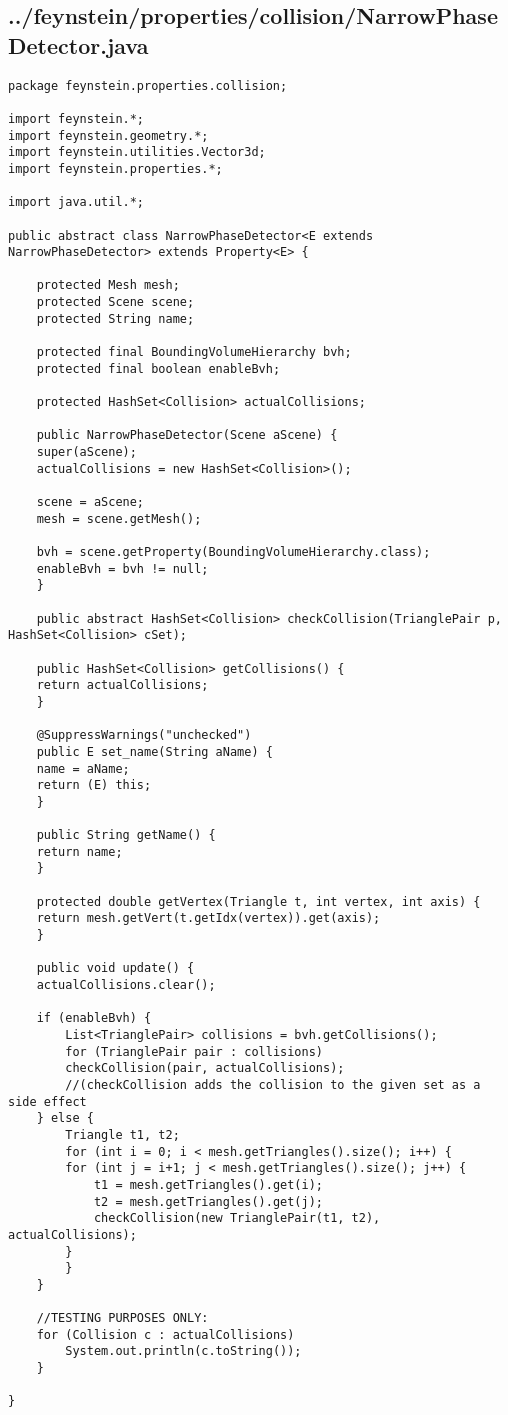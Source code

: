 \subsection*{../feynstein/properties/collision/NarrowPhaseDetector.java}
\begin{lstlisting}
package feynstein.properties.collision;

import feynstein.*;
import feynstein.geometry.*;
import feynstein.utilities.Vector3d;
import feynstein.properties.*;

import java.util.*;

public abstract class NarrowPhaseDetector<E extends NarrowPhaseDetector> extends Property<E> {
    
    protected Mesh mesh;
    protected Scene scene;
    protected String name;

    protected final BoundingVolumeHierarchy bvh;
    protected final boolean enableBvh;

    protected HashSet<Collision> actualCollisions;

    public NarrowPhaseDetector(Scene aScene) {
	super(aScene);
	actualCollisions = new HashSet<Collision>();

	scene = aScene;
	mesh = scene.getMesh();

	bvh = scene.getProperty(BoundingVolumeHierarchy.class);
	enableBvh = bvh != null;
    }

    public abstract HashSet<Collision> checkCollision(TrianglePair p, HashSet<Collision> cSet);

    public HashSet<Collision> getCollisions() {
	return actualCollisions;
    }

    @SuppressWarnings("unchecked")
    public E set_name(String aName) {
	name = aName;
	return (E) this;
    }

    public String getName() {
	return name;
    }

    protected double getVertex(Triangle t, int vertex, int axis) {
	return mesh.getVert(t.getIdx(vertex)).get(axis);
    }

    public void update() {
	actualCollisions.clear();

	if (enableBvh) {
	    List<TrianglePair> collisions = bvh.getCollisions();
	    for (TrianglePair pair : collisions)
		checkCollision(pair, actualCollisions);
		//(checkCollision adds the collision to the given set as a side effect
	} else {
	    Triangle t1, t2;
	    for (int i = 0; i < mesh.getTriangles().size(); i++) {
		for (int j = i+1; j < mesh.getTriangles().size(); j++) {
		    t1 = mesh.getTriangles().get(i);
		    t2 = mesh.getTriangles().get(j);
		    checkCollision(new TrianglePair(t1, t2), actualCollisions);
		}
	    }
	}
	
	//TESTING PURPOSES ONLY:
	for (Collision c : actualCollisions)
	    System.out.println(c.toString());
    }

}\end{lstlisting}

